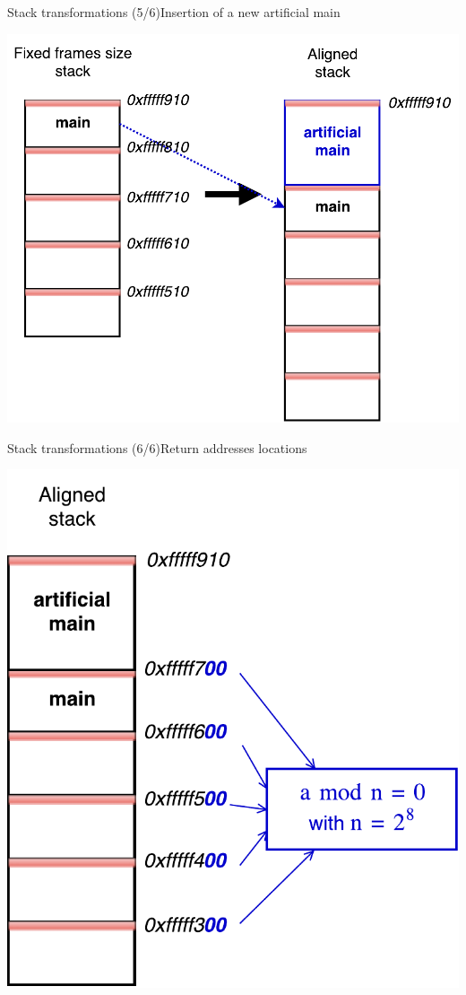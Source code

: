 \documentclass{beamer}
\begin{document}
\begin{frame}[c]{Stack transformations (5/6)}{Insertion of a new artificial main}
	\begin{center}
		\includegraphics[height=0.75\textheight]{images/stack_transfo_4.pdf}
	\end{center}
\end{frame}
\begin{frame}[c]{Stack transformations (6/6)}{Return addresses locations}
	\begin{center}
   		\includegraphics[height=0.75\textheight]{images/stack_transfo_5.pdf}
	\end{center}
\end{frame}
\end{document}
